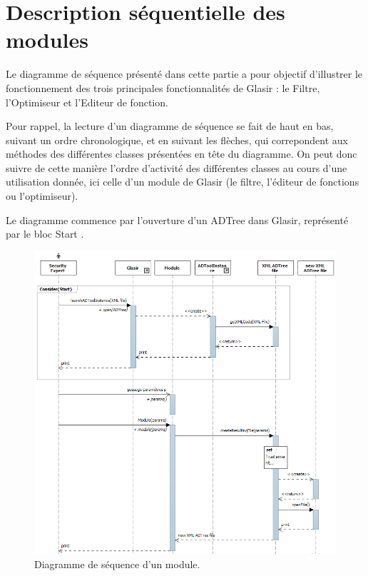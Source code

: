 \section{Description séquentielle des modules}
    \label{sec:modules}
    
Le diagramme de séquence présenté dans cette partie a pour objectif d'illustrer le fonctionnement des trois principales fonctionnalités de Glasir : le Filtre, l'Optimiseur et l'Editeur de fonction. 

Pour rappel, la lecture d'un diagramme de séquence se fait de haut en bas, suivant un ordre chronologique, et en suivant les flèches, qui correpondent aux méthodes des différentes classes présentées en tête du diagramme. On peut donc suivre de cette manière l'ordre d'activité des différentes classes au cours d'une utilisation donnée, ici celle d'un module de Glasir (le filtre, l'éditeur de fonctions ou l'optimiseur). 

Le diagramme commence par l'ouverture d'un ADTree dans Glasir, représenté par le bloc \og Start \fg{}.

	    \begin{figure}[H]
	        \centering
	        \includegraphics[height=1\textwidth]{figure/moduleSeqDiag.png}
	        \caption{Diagramme de séquence d'un module.}
	        \label{fig:module}
	    \end{figure}


